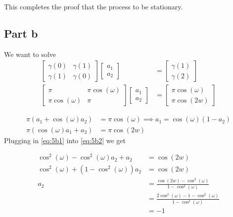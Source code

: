 \documentclass{article}
\begin{document}
This completes the proof that the process to be stationary.

\subsection*{Part b}
We want to solve
\begin{align*}
  \begin{bmatrix}
    \gamma(0) & \gamma(1)\\
    \gamma(1) & \gamma(0)
\end{bmatrix}
\begin{bmatrix}
    a_1\\
    a_2
\end{bmatrix}
&= \begin{bmatrix}
    \gamma(1)\\
    \gamma(2)
\end{bmatrix}\\
\begin{bmatrix}
    \pi & \pi \cos(\omega )\\
    \pi \cos(\omega ) & \pi
\end{bmatrix}
\begin{bmatrix}
    a_1\\
    a_2
\end{bmatrix}
&= \begin{bmatrix}
    \pi \cos(\omega )\\
    \pi \cos(2w)
\end{bmatrix}
\end{align*}

\begin{align}
\pi(a_1 + \cos(\omega ) a_2) &= \pi \cos(\omega) \implies a_1 = \cos(\omega )(1 - a_2) \label{eq:5b1}\\
\pi(\cos(\omega ) a_1 + a_2) &= \pi \cos(2w) \label{eq:5b2}
\end{align}
Plugging in \eqref{eq:5b1} into \eqref{eq:5b2} we get

\begin{align}
\cos^2 (\omega )- \cos^2(\omega ) a_2 + a_2 &= \cos(2w) \nonumber\\
\cos^2(\omega ) + (1 - \cos^2(\omega )) a_2 &= \cos(2w) \nonumber\\
a_2 &= \frac{\cos(2w) - \cos^2(\omega )}{1 - \cos^2(\omega )} \nonumber\\
&= \frac{2\cos^2(\omega ) - 1 - \cos^2(\omega )}{1 - \cos^2(\omega )} \label{eq:5b3}\\
&= -1 \nonumber
\end{align}
\end{document}

